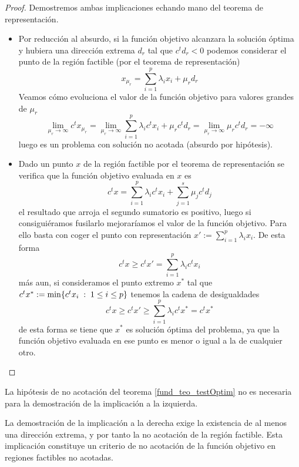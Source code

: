 \begin{proof}Demostremos ambas implicaciones echando mano del teorema de representación.
	\begin{itemize}
		\item[\bra] Por reducción al absurdo, si la función objetivo alcanzara la solución óptima y hubiera una dirección extrema $d_r$ tal que $c^td_r<0$ podemos considerar el punto de la región factible (por el teorema de representación)
		\begin{equation*}
			x_{\mu_r}=\sum_{i=1}^{p}\lambda_ix_i+\mu_rd_r
		\end{equation*}
		Veamos cómo evoluciona el valor de la función objetivo para valores grandes de $\mu_r$
		\begin{equation*}
			\lim\limits_{\mu_r\to\infty}c^tx_{\mu_r}=\lim\limits_{\mu_r\to\infty}\sum_{i=1}^{p}\lambda_ic^tx_i+\mu_rc^td_r=\lim\limits_{\mu_r\to\infty}\mu_rc^td_r=-\infty
		\end{equation*}
		luego es un problema con solución no acotada (absurdo por hipótesis).
		\item[\bla]Dado un punto $x$ de la región factible por el teorema de representación se verifica que la función objetivo evaluada en $x$ es\begin{equation*}
			c^tx=\sum_{i=1}^{p}\lambda_ic^tx_i+\sum_{j=1}^{s}\mu_jc^td_j
		\end{equation*} el resultado que arroja el segundo sumatorio es positivo, luego si consiguiéramos fusilarlo mejoraríamos el valor de la función objetivo. Para ello basta con coger el punto con representación $x':=\sum_{i=1}^{p}\lambda_ix_i$. De esta forma
		\begin{equation*}
			c^tx\geq c^tx'=\sum_{i=1}^{p}\lambda_ic^tx_i
		\end{equation*} más aun, si consideramos el punto extremo $x^*$ tal que $c^tx^*:=\min\{c^tx_i\;:\; 1\leq i\leq p\}$ tenemos la cadena de desigualdades \begin{equation*}
		c^tx\geq c^tx'\geq \sum_{i=1}^{p}\lambda_ic^tx^*=c^tx^*
	\end{equation*} de esta forma se tiene que $x^*$ es solución óptima del problema, ya que la función objetivo evaluada en ese punto es menor o igual a la de cualquier otro.\qedhere
	\end{itemize}
\end{proof}
\begin{obs}[No acotación]
	La hipótesis de no acotación del teorema \ref{fund_teo_testOptim} no es necesaria para la demostración de la implicación a la izquierda.
	
	La demostración de la implicación a la derecha exige la existencia de al menos una dirección extrema, y por tanto la no acotación de la región factible. Esta implicación constituye un criterio de no acotación de la función objetivo en regiones factibles no acotadas.
\end{obs}
